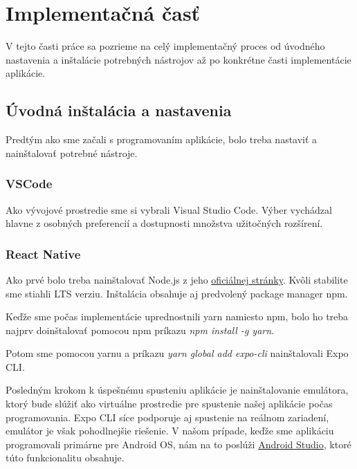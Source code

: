
\section{Implementačná časť}
V tejto časti práce sa pozrieme na celý implementačný proces od úvodného nastavenia a inštalácie potrebných nástrojov až po konkrétne časti implementácie aplikácie.

\subsection{Úvodná inštalácia a nastavenia}
Predtým ako sme začali s programovaním aplikácie, bolo treba nastaviť a nainštalovať potrebné nástroje.
\subsubsection{VSCode}
Ako vývojové prostredie sme si vybrali Visual Studio Code. Výber vychádzal hlavne z osobných preferencií a dostupnosti množstva užitočných rozšírení.
\subsubsection{React Native}
\begin{itemize}
{\item Ako prvé bolo treba nainštalovať Node.js z jeho \href{https://nodejs.org/en/download/}{oficiálnej stránky}. Kvôli stabilite sme stiahli LTS verziu. Inštalácia obsahuje aj predvolený package manager npm.} 
{\item Keďže sme počas implementácie uprednostnili yarn namiesto npm, bolo ho treba najprv doinštalovať pomocou npm príkazu \textit{npm install -g yarn}.} 
{\item Potom sme pomocou yarnu a príkazu \textit{yarn global add expo-cli} nainštalovali Expo CLI.} 
{\item Posledným krokom k úspešnému spusteniu aplikácie je nainštalovanie emulátora, ktorý bude slúžiť ako virtuálne prostredie pre spustenie našej aplikácie počas programovania. Expo CLI síce podporuje aj spustenie na reálnom zariadení, emulátor je však pohodlnejšie riešenie. V našom prípade, keďže sme aplikáciu programovali primárne pre Android OS, nám na to poslúži \href{https://developer.android.com/studio}{Android Studio}, ktoré túto funkcionalitu obsahuje.}
\end{itemize}

